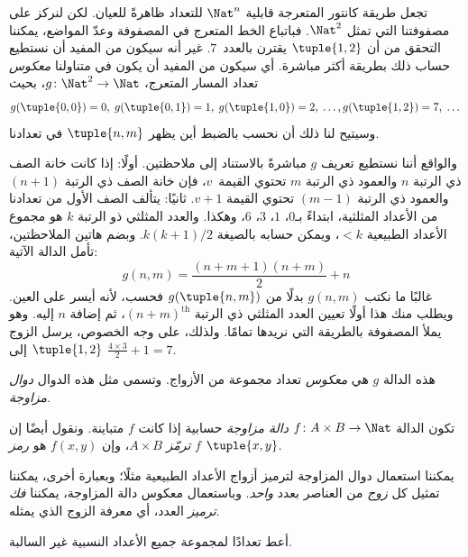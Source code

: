 \documentclass[../../../include/open-logic-section]{subfiles}
\begin{document}

\begin{explain}
تجعل طريقة كانتور المتعرجة قابلية $\Nat^n$ للتعداد ظاهرةً للعيان.
لكن لنركز على مصفوفتنا التي تمثل $\Nat^2$. فباتباع الخط المتعرج في
المصفوفة وعدّ المواضع، يمكننا التحقق من أن $\tuple{1,2}$ يقترن
بالعدد~$7$. غير أنه سيكون من المفيد أن نستطيع حساب ذلك بطريقة
أكثر مباشرة. أي سيكون من المفيد أن يكون في متناولنا \emph{معكوس}
تعداد المسار المتعرج، $g\colon \Nat^2 \to \Nat$، بحيث
\[
g(\tuple{0,0}) = 0, \;
g(\tuple{0,1}) = 1, \;
g(\tuple{1,0}) = 2, \; \dots,
g(\tuple{1,2}) = 7, \; \dots
\]
وسيتيح لنا ذلك أن نحسب بالضبط أين يظهر $\tuple{n, m}$ في تعدادنا.

والواقع أننا نستطيع تعريف $g$ مباشرةً بالاستناد إلى ملاحظتين. أولًا:
إذا كانت خانة الصف ذي الرتبة $n$ والعمود ذي الرتبة $m$ تحتوي
القيمة~$v$، فإن خانة الصف ذي الرتبة $(n+1)$ والعمود ذي الرتبة
$(m-1)$ تحتوي القيمة $v + 1$. ثانيًا: يتألف الصف الأول من تعدادنا
من الأعداد المثلثية، ابتداءً بـ$0$، $1$، $3$، $6$، وهكذا. والعدد
المثلثي ذو الرتبة $k$ هو مجموع الأعداد الطبيعية $< k$، ويمكن حسابه
بالصيغة $k(k+1)/2$. وبضم هاتين الملاحظتين، تأمل الدالة الآتية:
\[
  g(n,m) = \frac{(n+m+1)(n+m)}{2} + n
\]
غالبًا ما نكتب $g(n, m)$ بدلًا من $g(\tuple{n, m})$ فحسب، لأنه أيسر
على العين. ويطلب منك هذا أولًا تعيين العدد المثلثي ذي الرتبة
$(n+m)^\text{th}$، ثم إضافة $n$ إليه. وهو يملأ المصفوفة بالطريقة
التي نريدها تمامًا. ولذلك، على وجه الخصوص، يرسل الزوج
$\tuple{1, 2}$ إلى $\frac{4 \times 3}{2} +
1 = 7$.

هذه الدالة $g$ هي \emph{معكوس} تعداد مجموعة من الأزواج. وتسمى مثل
هذه الدوال \emph{دوال مزاوجة}.
\end{explain}

\begin{defn}
  تكون الدالة $f\colon A \times B \to \Nat$ \emph{دالة مزاوجة}
  حسابية إذا كانت $f$ متباينة. ونقول أيضًا إن $f$ \emph{ترمّز}
  $A \times B$، وإن $f(x,y)$ هو \emph{رمز} $\tuple{x,y}$.
\end{defn}

\begin{explain}
يمكننا استعمال دوال المزاوجة لترميز أزواج الأعداد الطبيعية مثلًا؛
وبعبارة أخرى، يمكننا تمثيل كل \emph{زوج} من العناصر بعدد
\emph{واحد}. وباستعمال معكوس دالة المزاوجة، يمكننا \emph{فك ترميز}
العدد، أي معرفة الزوج الذي يمثله.
\end{explain}

\begin{prob}
أعط تعدادًا لمجموعة جميع الأعداد النسبية غير السالبة.
\end{prob}
\end{document}
